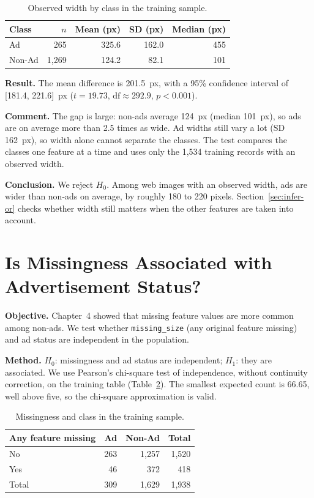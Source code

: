 \begin{table}[htbp]
\centering
\caption{Observed width by class in the training sample.}
\label{tab:infer-width}
\begin{tabular}{lrrrr}
\toprule
Class & $n$ & Mean (px) & SD (px) & Median (px)\\
\midrule
Ad & 265 & 325.6 & 162.0 & 455\\
Non-Ad & 1,269 & 124.2 & 82.1 & 101\\
\bottomrule
\end{tabular}
\end{table}

\textbf{Result.} The mean difference is 201.5~px, with a 95\% confidence
interval of [181.4, 221.6]~px ($t=19.73$, $\mathrm{df}\approx 292.9$,
$p<0.001$).

\textbf{Comment.} The gap is large: non-ads average 124~px (median
101~px), so ads are on average more than 2.5 times as wide. Ad widths still vary a
lot (SD 162~px), so width alone cannot separate the classes. The test
compares the classes one feature at a time and uses only the 1,534 training
records with an observed width.

\textbf{Conclusion.} We reject $H_0$. Among web images with an observed
width, ads are wider than non-ads on average, by roughly 180 to 220 pixels.
Section~\ref{sec:infer-or} checks whether width still matters when the other
features are taken into account.

\section{Is Missingness Associated with Advertisement Status?}
\label{sec:infer-missing}
\textbf{Objective.} Chapter~4 showed that missing feature values are more
common among non-ads. We test whether \texttt{missing\_size} (any original
feature missing) and ad status are independent in the population.

\textbf{Method.} $H_0$: missingness and ad status are independent;
$H_1$: they are associated. We use Pearson's chi-square test of independence,
without continuity correction, on the training table
(Table~\ref{tab:infer-missing}). The smallest expected count is 66.65, well
above five, so the chi-square approximation is valid.

\begin{table}[htbp]
\centering
\caption{Missingness and class in the training sample.}
\label{tab:infer-missing}
\begin{tabular}{lrrr}
\toprule
Any feature missing & Ad & Non-Ad & Total\\
\midrule
No & 263 & 1,257 & 1,520\\
Yes & 46 & 372 & 418\\
\midrule
Total & 309 & 1,629 & 1,938\\
\bottomrule
\end{tabular}
\end{table}

